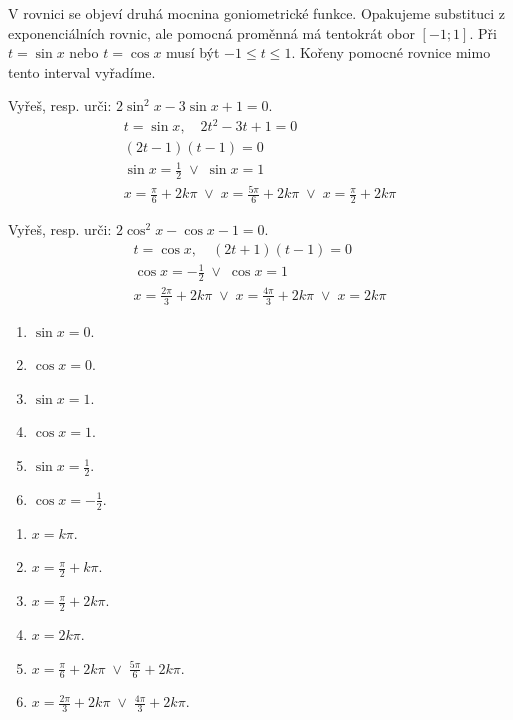 \documentclass[11pt,a4paper]{article}
\begin{document}
V rovnici se objeví druhá mocnina goniometrické funkce. Opakujeme substituci z exponenciálních rovnic, ale pomocná proměnná má tentokrát obor $[-1;1]$.
Při $t=\sin x$ nebo $t=\cos x$ musí být $-1\le t\le1$. Kořeny pomocné rovnice mimo tento interval vyřadíme.
\begin{prikladReseniBox}[title={Příklad 1}]
Vyřeš, resp. urči: $2\sin^2x-3\sin x+1=0$.
\tcblower
\[\begin{aligned}t=\sin x,\quad 2t^2-3t+1=0 \\ (2t-1)(t-1)=0 \\ \sin x=\frac{1}{2}\;\lor\;\sin x=1 \\ x=\frac{\pi}{6}+2k\pi\;\lor\;x=\frac{5\pi}{6}+2k\pi\;\lor\;x=\frac{\pi}{2}+2k\pi\end{aligned}\]
\end{prikladReseniBox}
\begin{prikladReseniBox}[title={Příklad 2}]
Vyřeš, resp. urči: $2\cos^2x-\cos x-1=0$.
\tcblower
\[\begin{aligned}t=\cos x,\quad(2t+1)(t-1)=0 \\ \cos x=-\frac{1}{2}\;\lor\;\cos x=1 \\ x=\frac{2\pi}{3}+2k\pi\;\lor\;x=\frac{4\pi}{3}+2k\pi\;\lor\;x=2k\pi\end{aligned}\]
\end{prikladReseniBox}
\begin{zadaniReseniBox}[title={Samostatná práce 1}]
\begin{enumerate}[label=\alph*)]
\item $\sin x=0$.
\item $\cos x=0$.
\item $\sin x=1$.
\item $\cos x=1$.
\item $\sin x=\frac{1}{2}$.
\item $\cos x=-\frac{1}{2}$.
\end{enumerate}
\tcblower
\begin{enumerate}[label=\alph*)]
\item $x=k\pi$.
\item $x=\frac{\pi}{2}+k\pi$.
\item $x=\frac{\pi}{2}+2k\pi$.
\item $x=2k\pi$.
\item $x=\frac{\pi}{6}+2k\pi\;\lor\;\frac{5\pi}{6}+2k\pi$.
\item $x=\frac{2\pi}{3}+2k\pi\;\lor\;\frac{4\pi}{3}+2k\pi$.
\end{enumerate}
\end{zadaniReseniBox}
\end{document}
